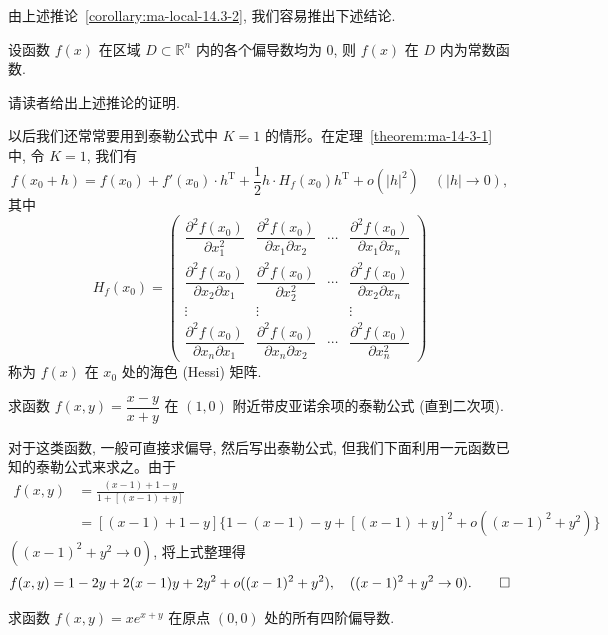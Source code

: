由上述推论~\ref{corollary:ma-local-14.3-2}, 我们容易推出下述结论.

\begin{corollary}\label{corollary:ma-local-14.3-3}
设函数 $f(x)$ 在区域 $D\subset\mathbb R^n$ 内的各个偏导数均为 0, 则 $f(x)$ 在 $D$ 内为常数函数.
\end{corollary}

请读者给出上述推论的证明.

以后我们还常常要用到泰勒公式中 $K=1$ 的情形。在定理~\ref{theorem:ma-14-3-1} 中, 令 $K=1$, 我们有
\[
  f(x_0+h)=f(x_0)+f'(x_0)\cdot h^\mathrm T
  +\frac12 h\cdot H_f(x_0)h^\mathrm T+o(|h|^2)
  \quad(|h|\to0),
\]
其中
\[
  H_f(x_0)=
  \begin{pmatrix}
    \dfrac{\partial^2 f(x_0)}{\partial x_1^2} &
    \dfrac{\partial^2 f(x_0)}{\partial x_1\partial x_2} &
    \cdots &
    \dfrac{\partial^2 f(x_0)}{\partial x_1\partial x_n}\\
    \dfrac{\partial^2 f(x_0)}{\partial x_2\partial x_1} &
    \dfrac{\partial^2 f(x_0)}{\partial x_2^2} &
    \cdots &
    \dfrac{\partial^2 f(x_0)}{\partial x_2\partial x_n}\\
    \vdots & \vdots & & \vdots\\
    \dfrac{\partial^2 f(x_0)}{\partial x_n\partial x_1} &
    \dfrac{\partial^2 f(x_0)}{\partial x_n\partial x_2} &
    \cdots &
    \dfrac{\partial^2 f(x_0)}{\partial x_n^2}
  \end{pmatrix}
\]
称为 $f(x)$ 在 $x_0$ 处的海色 (Hessi) 矩阵.

\begin{example}\label{example:ma-14-3-1}
求函数 $f(x,y)=\dfrac{x-y}{x+y}$ 在 $(1,0)$ 附近带皮亚诺余项的泰勒公式 (直到二次项).
\end{example}


\begin{solve}
对于这类函数, 一般可直接求偏导, 然后写出泰勒公式, 但我们下面利用一元函数已知的泰勒公式来求之。由于
\[
\begin{aligned}
  f(x,y)
  &=\frac{(x-1)+1-y}{1+[(x-1)+y]}\\
  &=[(x-1)+1-y]\{1-(x-1)-y+[(x-1)+y]^2
  +o((x-1)^2+y^2)\}
\end{aligned}
\]
$((x-1)^2+y^2\to0)$, 将上式整理得
\[
  f(x,y)=1-2y+2(x-1)y+2y^2+o((x-1)^2+y^2),
  \quad ((x-1)^2+y^2\to0).
\qedhere
\]
\end{solve}


\begin{example}\label{example:ma-14-3-2}
求函数 $f(x,y)=xe^{x+y}$ 在原点 $(0,0)$ 处的所有四阶偏导数.
\end{example}


